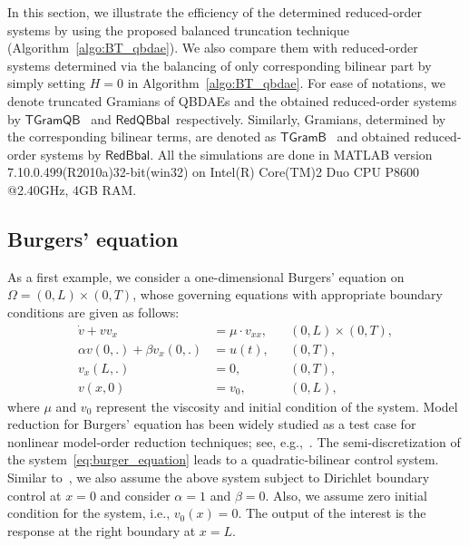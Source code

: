 \def\redQBbal {\ensuremath{{\mathsf{RedQBbal}}}}
\def\redBbal {\ensuremath{{\mathsf{RedBbal}}}}

\def\GramQB {\ensuremath{{\mathsf{TGramQB}}}}
\def\GramB {\ensuremath{{\mathsf{TGramB}}}}

In this section, we illustrate the efficiency of the determined  reduced-order systems by using the proposed balanced truncation technique (Algorithm~\ref{algo:BT_qbdae}). We also compare them with reduced-order systems determined via the balancing of only corresponding bilinear part  by simply setting $H = 0$ in Algorithm~\ref{algo:BT_qbdae}. For ease of notations, we denote truncated Gramians of QBDAEs and the obtained reduced-order systems by \GramQB~ and \redQBbal~respectively.  Similarly,  Gramians, determined by the corresponding bilinear terms, are denoted as \GramB~ and obtained reduced-order systems by \redBbal. All the simulations are done in MATLAB\textsuperscript{\textregistered} version 7.10.0.499(R2010a)32-bit(win32) on Intel(R) Core(TM)2 Duo CPU P8600 @2.40GHz, 4GB RAM.
\subsection{Burgers' equation}
As a first example, we consider a one-dimensional Burgers' equation on $\Omega = (0,L)\times (0,T)$, whose governing equations with appropriate boundary conditions are given as follows:
\begin{equation}\label{eq:burger_equation}
 \begin{aligned}
  \dot{v} + vv_x &= \mu\cdot v_{xx}, &  &(0,L)\times (0,T),\\
  \alpha v(0,.) + \beta v_x(0,.) &= u(t), &  &(0,T),\\
  v_x(L,.) &= 0, \quad & &(0,T),\\
  v(x,0) &=v_0,\quad & &(0,L),
 \end{aligned}
\end{equation}
where $\mu$ and $v_0$ represent the viscosity and  initial condition of the system. Model reduction for Burgers' equation has been widely studied as a test case for nonlinear model-order reduction techniques; see, e.g.,~\cite{morBenB15,morKunV08,li2005compact}. The semi-discretization of the system~\eqref{eq:burger_equation} leads to a quadratic-bilinear control system. Similar to~\cite{morBenB15}, we also assume the above system subject to Dirichlet boundary control at $x=0$ and consider $\alpha =1$ and $\beta = 0$. Also, we assume  zero initial condition for the system, i.e.,  $v_0(x) = 0$. The output of the interest is the response at the right boundary at $x = L$.

